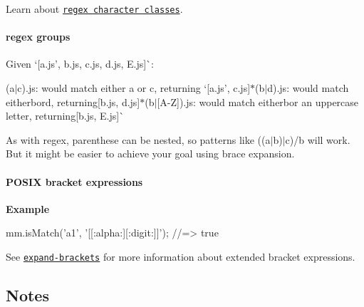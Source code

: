 Learn about \href{http://www.regular-expressions.info/charclass.html}{\tt regex character classes}.

\paragraph*{regex groups}

Given `\mbox{[}\textquotesingle{}a.\+js', \textquotesingle{}b.\+js\textquotesingle{}, \textquotesingle{}c.\+js\textquotesingle{}, \textquotesingle{}d.\+js\textquotesingle{}, \textquotesingle{}E.\+js\textquotesingle{}\mbox{]}\`{}\+:


\begin{DoxyItemize}
\item {\ttfamily (a$\vert$c).js}\+: would match either {\ttfamily a} or {\ttfamily c}, returning `\mbox{[}\textquotesingle{}a.\+js', \textquotesingle{}c.\+js\textquotesingle{}\mbox{]}{\ttfamily  $\ast$}(b$\vert$d).js{\ttfamily \+: would match either}b{\ttfamily or}d{\ttfamily , returning}\mbox{[}\textquotesingle{}b.\+js\textquotesingle{}, \textquotesingle{}d.\+js\textquotesingle{}\mbox{]}{\ttfamily  $\ast$}(b$\vert$\mbox{[}A-\/Z\mbox{]}).js{\ttfamily \+: would match either}b{\ttfamily or an uppercase letter, returning}\mbox{[}\textquotesingle{}b.\+js\textquotesingle{}, \textquotesingle{}E.\+js\textquotesingle{}\mbox{]}\`{}
\end{DoxyItemize}

As with regex, parenthese can be nested, so patterns like {\ttfamily ((a$\vert$b)$\vert$c)/b} will work. But it might be easier to achieve your goal using brace expansion.

\paragraph*{P\+O\+S\+IX bracket expressions}

{\bfseries Example}


\begin{DoxyCode}
mm.isMatch('a1', '[[:alpha:][:digit:]]');
//=> true
\end{DoxyCode}


See \href{https://github.com/jonschlinkert/expand-brackets}{\tt expand-\/brackets} for more information about extended bracket expressions.





\subsection*{Notes}

